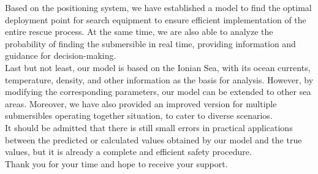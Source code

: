 \documentclass[12pt]{article}  %
\begin{document}
Based on the positioning system, we have established a model to find the optimal deployment point for search equipment to ensure efficient implementation of the entire rescue process. At the same time, we are also able to analyze the probability of finding the submersible in real time, providing information and guidance for decision-making.\\

Last but not least, our model is based on the Ionian Sea, with its ocean currents, temperature, density, and other information as the basis for analysis. However, by modifying the corresponding parameters, our model can be extended to other sea areas. Moreover, we have also provided an improved version for multiple submersibles operating together situation, to cater to diverse scenarios.\\

It should be admitted that there is still small errors in practical applications between the predicted or calculated values obtained by our model and the true values, but it is already a complete and efficient safety procedure. \\

Thank you for your time and hope to receive your support.
\end{document}
